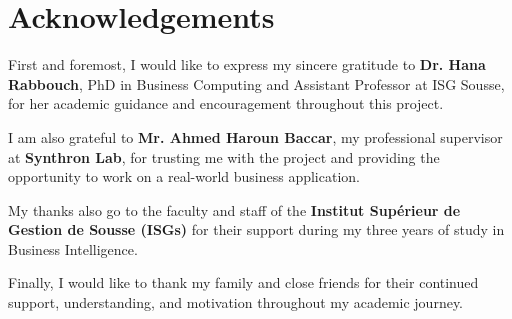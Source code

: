 \chapter*{Acknowledgements}

First and foremost, I would like to express my sincere gratitude to \textbf{Dr. Hana Rabbouch}, PhD in Business Computing and Assistant Professor at ISG Sousse, for her academic guidance and encouragement throughout this project.

I am also grateful to \textbf{Mr. Ahmed Haroun Baccar}, my professional supervisor at \textbf{Synthron Lab}, for trusting me with the project and providing the opportunity to work on a real-world business application.

My thanks also go to the faculty and staff of the \textbf{Institut Supérieur de Gestion de Sousse (ISGs)} for their support during my three years of study in Business Intelligence.

Finally, I would like to thank my family and close friends for their continued support, understanding, and motivation throughout my academic journey.
